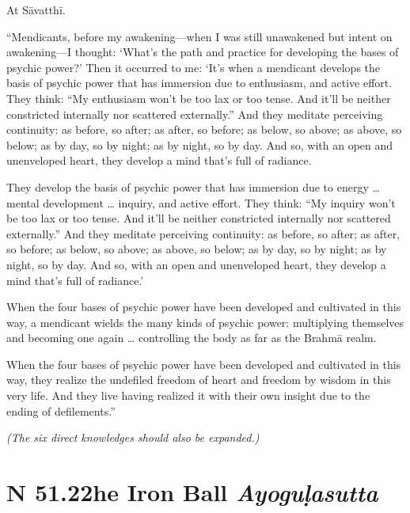 \documentclass[12pt,openany]{book}%
\newcommand*{\suttatitleacronym}[1]{\smaller[2]{#1}\vspace*{.3em}}
\newcommand*{\suttatitletranslation}[1]{\linebreak{#1}}
\newcommand*{\suttatitleroot}[1]{\linebreak\smaller[2]\itshape{#1}}
\newcommand*{\tocacronym}[1]{\hspace*{-3.3em}{#1}\quad}
\newcommand*{\toctranslation}[1]{#1}
\newcommand*{\tocroot}[1]{(\textit{#1})}
\newcommand*{\scendsection}[1]{\begin{center}\textit{#1}\end{center}}
\begin{document}
At \textsanskrit{Sāvatthī}. 

“Mendicants, before my awakening—when I was still unawakened but intent on awakening—I thought: ‘What’s the path and practice for developing the bases of psychic power?’ Then it occurred to me: ‘It’s when a mendicant develops the basis of psychic power that has immersion due to enthusiasm, and active effort. They think: “My enthusiasm won’t be too lax or too tense. And it’ll be neither constricted internally nor scattered externally.” And they meditate perceiving continuity: as before, so after; as after, so before; as below, so above; as above, so below; as by day, so by night; as by night, so by day. And so, with an open and unenveloped heart, they develop a mind that’s full of radiance. 

They develop the basis of psychic power that has immersion due to energy … mental development … inquiry, and active effort. They think: “My inquiry won’t be too lax or too tense. And it’ll be neither constricted internally nor scattered externally.” And they meditate perceiving continuity: as before, so after; as after, so before; as below, so above; as above, so below; as by day, so by night; as by night, so by day. And so, with an open and unenveloped heart, they develop a mind that’s full of radiance.’ 

When the four bases of psychic power have been developed and cultivated in this way, a mendicant wields the many kinds of psychic power: multiplying themselves and becoming one again … controlling the body as far as the \textsanskrit{Brahmā} realm. 

When the four bases of psychic power have been developed and cultivated in this way, they realize the undefiled freedom of heart and freedom by wisdom in this very life. And they live having realized it with their own insight due to the ending of defilements.” 

\scendsection{(The six direct knowledges should also be expanded.) }

%
\section*{{\suttatitleacronym SN 51.22}{\suttatitletranslation The Iron Ball }{\suttatitleroot Ayoguḷasutta}}
\addcontentsline{toc}{section}{\tocacronym{SN 51.22} \toctranslation{The Iron Ball } \tocroot{Ayoguḷasutta}}
\end{document}
